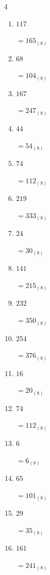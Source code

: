\begin{multicols}{4}
\begin{enumerate}
        $=271_{(8)}$

  \item $117$

        $=165_{(8)}$

  \item $68$

        $=104_{(8)}$

  \item $167$

        $=247_{(8)}$

  \item $44$

        $=54_{(8)}$

  \item $74$

        $=112_{(8)}$

  \item $219$

        $=333_{(8)}$

  \item $24$

        $=30_{(8)}$

  \item $141$

        $=215_{(8)}$

  \item $232$

        $=350_{(8)}$

  \item $254$

        $=376_{(8)}$

  \item $16$

        $=20_{(8)}$

  \item $74$

        $=112_{(8)}$

  \item $6$

        $=6_{(8)}$

\columnbreak %

  \item $65$

        $=101_{(8)}$

  \item $29$

        $=35_{(8)}$

  \item $161$

        $=241_{(8)}$


\end{enumerate}
\end{multicols}
